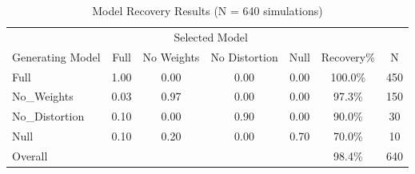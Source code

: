 \begin{table}[h]
\centering
\caption{Model Recovery Results (N = 640 simulations)}
\begin{tabular}{lcccc|cc}
\hline
& \multicolumn{4}{c|}{Selected Model} & & \\
Generating Model & Full & No Weights & No Distortion & Null & Recovery\% & N \\
\hline
Full & 1.00 & 0.00 & 0.00 & 0.00 & 100.0\% & 450 \\
No_Weights & 0.03 & 0.97 & 0.00 & 0.00 & 97.3\% & 150 \\
No_Distortion & 0.10 & 0.00 & 0.90 & 0.00 & 90.0\% & 30 \\
Null & 0.10 & 0.20 & 0.00 & 0.70 & 70.0\% & 10 \\
\hline
Overall & \multicolumn{4}{c|}{} & 98.4\% & 640 \\
\hline
\end{tabular}
\end{table}
